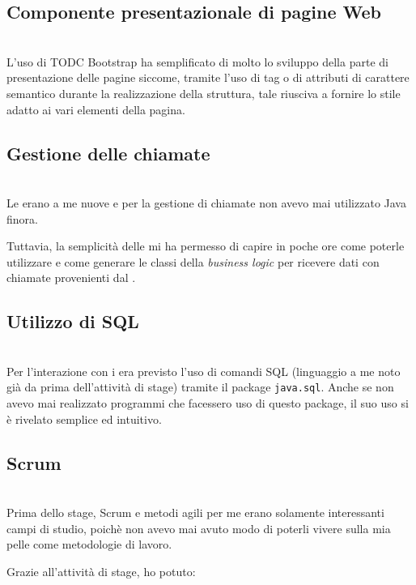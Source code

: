 \subsection{Componente presentazionale di pagine Web} \mbox{} \\

L'uso di TODC Bootstrap ha semplificato di molto lo sviluppo della parte di
presentazione delle pagine siccome, tramite l'uso di tag o di attributi di
carattere semantico durante la realizzazione della struttura, tale
 riusciva a fornire lo stile adatto ai vari elementi della
pagina.

\subsection{Gestione delle chiamate } \mbox{} \\

Le  erano a me nuove e per la gestione di chiamate 
non avevo mai utilizzato Java finora.

Tuttavia, la semplicità delle  mi ha permesso di capire in poche
ore come poterle utilizzare e come generare le classi della \emph{business
logic} per ricevere dati con chiamate  provenienti dal \FREND.

\subsection{Utilizzo di SQL} \mbox{} \\

Per l'interazione con i  era previsto l'uso di comandi SQL
(linguaggio a me noto già da prima dell'attività di stage) tramite il package
\texttt{java.sql}. Anche se non avevo mai realizzato programmi che facessero
uso di questo package, il suo uso si è rivelato semplice ed intuitivo.

\subsection{Scrum} \mbox{} \\

Prima dello stage, Scrum e metodi agili per me erano solamente interessanti
campi di studio, poichè non avevo mai avuto modo di poterli vivere sulla mia
pelle come metodologie di lavoro.

Grazie all'attività di stage, ho potuto:

